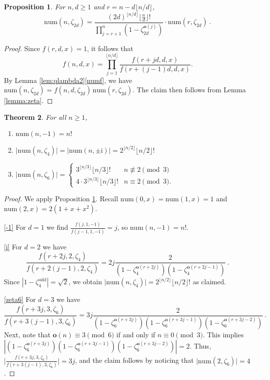 \documentclass[reqno]{amsart}
\def\num{\mathrm{num}}
\def\o{\mathbf o}
\newcommand{\mi}{\mathrm{i}}
\newtheorem{theorem}{Theorem}[section]
\newtheorem{proposition}[theorem]{Proposition}
\theoremstyle{definition}
\begin{document}
\begin{proposition} \label{prop:numr}
For  $n,d\geq 1$ and $r=n-d\lfloor n/d\rfloor$,
\[\num(n,\zeta_{2d})=\frac{(2d)^{\lfloor n/d\rfloor}\lfloor\frac{n}{d}\rfloor!}{\prod_{j=r+1}^n(1-\zeta_{2d}^{\o(j)})}\cdot \num(r,\zeta_{2d})\:.\]
\end{proposition}
\begin{proof}
Since $f(r,d,x)=1$, it follows that $$f(n,d,x)=\prod_{j=1}^{\lfloor n/d\rfloor}\frac{f(r+jd,d,x)}{f(r+(j-1)d,d,x)}.$$
By Lemma \ref{lem:qlambda2}\ref{numf}, we have $\num(n,\zeta_{2d})=f(n,d,\zeta_{2d})\,\num(r,\zeta_{2d})$.
The claim then follows from Lemma \ref{lemma:zeta}.
\end{proof}
\begin{theorem}\label{thm:-1}
    For all $n\geq 1$, 
        \begin{enumerate} [label=(\alph*)]
        \item \label{-1}$\num(n,-1)=n!$
        \item \label{i}$\lvert\num(n,\zeta_4)\rvert=\lvert\num(n,\pm\mi)\rvert=2^{\lfloor n/2 
  \rfloor}\lfloor n/2 \rfloor! $
        \item \label{zeta6}$\lvert\num(n,\zeta_6)\rvert=\begin{cases}
        3^{\lfloor n/3 \rfloor}\lfloor n/3\rfloor !  & n\not\equiv 2 \pmod 3 \\ 4\cdot    3^{\lfloor n/3 \rfloor}\lfloor n/3\rfloor ! & n\equiv 2 \pmod 3.
        \end{cases}$ 
    \end{enumerate}
\end{theorem}
\begin{proof} We apply Proposition \ref{prop:numr}. Recall $\num(0,x)=\num(1,x)=1$ and $\num(2,x)=2(1+x+x^2)$.

\ref{-1}
For $d=1$ we find $\frac{f(j,1,-1)}{f(j-1,1,-1)}=j$, so $\num(n,-1)=n!$.

\ref{i} For $d=2$ we have 
\[\frac{f(r+2j,2,\zeta_4)}{f(r+2(j-1),2,\zeta_4)}=2j \frac{2}{(1-\zeta_4^{\o(r+2j)})(1-\zeta_4^{\o(r+2j-1)})}\:.\]
Since $|1-\zeta_4^{\textrm{odd}}|=\sqrt 2$,
we obtain $\lvert \num(n,\zeta_4)\rvert=2^{\lfloor n/2\rfloor}\lfloor n/2\rfloor!$ as claimed.

 \ref{zeta6}
 For $d=3$ we have
 \[\frac{f(r+3j,3,\zeta_6)}{f(r+3(j-1),3,\zeta_6)}=3j\frac{2}{(1-\zeta_6^{\o(r+3j)})(1-\zeta_6^{\o(r+3j-1)})(1-\zeta_6^{\o(r+3j-2)})}\:.\]
Next, note that $\o(n)\equiv 3\pmod 6$ if and only if $n\equiv 0\pmod 3$.   This implies $|(1-\zeta_6^{\o(r+3j)})(1-\zeta_6^{\o(r+3j-1)})(1-\zeta_6^{\o(r+3j-2)})|=2$. Thus,
   $\lvert \frac{f(r+3j,3,\zeta_6)}{f(r+3(j-1),3,\zeta_6)}\rvert=3j$, and the claim follows by noticing that  $ \lvert\num(2,\zeta_6)\rvert=4$.
\end{proof}
\end{document}

